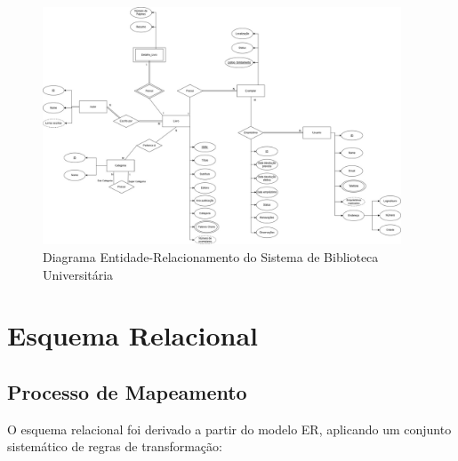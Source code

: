 \documentclass[12pt,a4paper]{article}
\begin{document}
\begin{figure}[H]
    \centering
    \includegraphics[width=0.95\textwidth]{ModeloConceitual.png}
    \caption{Diagrama Entidade-Relacionamento do Sistema de Biblioteca Universitária}
    \label{fig:diagrama-er}
\end{figure}

\section{Esquema Relacional}

\subsection{Processo de Mapeamento}

O esquema relacional foi derivado a partir do modelo ER, aplicando um conjunto sistemático de regras de transformação:
\end{document}
